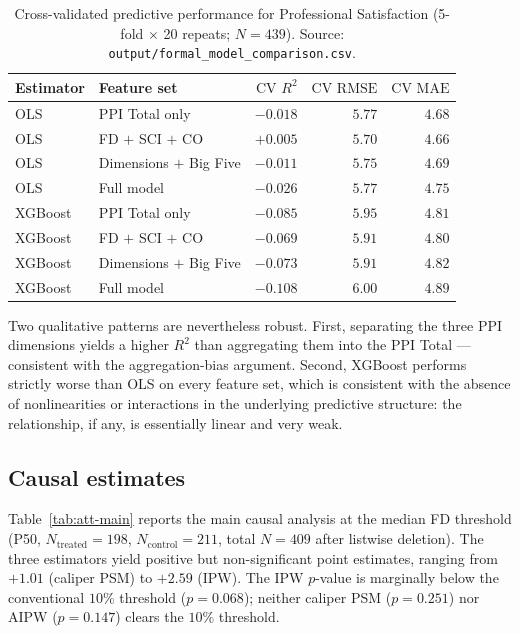 \documentclass[11pt,a4paper]{article}
\begin{document}
\begin{table}[h!]
\centering
\caption{Cross-validated predictive performance for Professional
Satisfaction (5-fold $\times$ 20 repeats; $N=439$). Source:
\texttt{output/formal\_model\_comparison.csv}.}
\label{tab:cv}
\begin{tabular}{llrrr}
\toprule
\textbf{Estimator} & \textbf{Feature set} & $\text{CV } R^2$ & $\text{CV RMSE}$ & $\text{CV MAE}$ \\
\midrule
OLS     & PPI Total only         & $-0.018$ & $5.77$ & $4.68$ \\
OLS     & FD $+$ SCI $+$ CO      & $+0.005$ & $5.70$ & $4.66$ \\
OLS     & Dimensions $+$ Big Five & $-0.011$ & $5.75$ & $4.69$ \\
OLS     & Full model              & $-0.026$ & $5.77$ & $4.75$ \\
\midrule
XGBoost & PPI Total only         & $-0.085$ & $5.95$ & $4.81$ \\
XGBoost & FD $+$ SCI $+$ CO      & $-0.069$ & $5.91$ & $4.80$ \\
XGBoost & Dimensions $+$ Big Five & $-0.073$ & $5.91$ & $4.82$ \\
XGBoost & Full model              & $-0.108$ & $6.00$ & $4.89$ \\
\bottomrule
\end{tabular}
\end{table}

Two qualitative patterns are nevertheless robust. First, separating
the three PPI dimensions yields a higher $R^2$ than aggregating them
into the PPI Total --- consistent with the aggregation-bias argument.
Second, XGBoost performs strictly worse than OLS on every feature
set, which is consistent with the absence of nonlinearities or
interactions in the underlying predictive structure: the relationship,
if any, is essentially linear and very weak.

\subsection{Causal estimates}
\label{sec:results-causal}

Table~\ref{tab:att-main} reports the main causal analysis at the
median FD threshold (P50, $N_{\text{treated}}=198$,
$N_{\text{control}}=211$, total $N=409$ after listwise deletion). The
three estimators yield positive but non-significant point estimates,
ranging from $+1.01$ (caliper PSM) to $+2.59$ (IPW). The IPW $p$-value
is marginally below the conventional $10\%$ threshold ($p=0.068$);
neither caliper PSM ($p=0.251$) nor AIPW ($p=0.147$) clears the
$10\%$ threshold.
\end{document}
